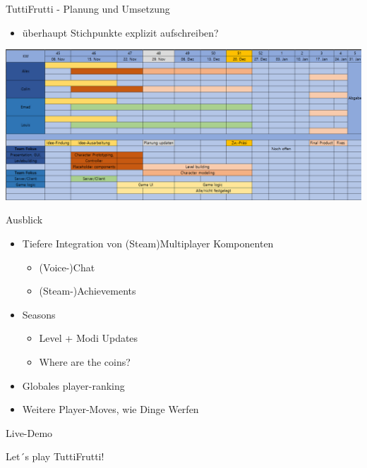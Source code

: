 \documentclass[xcolor=dvipsnames]{beamer}
\begin{document}
\begin{frame}{TuttiFrutti - Planung und Umsetzung}
\begin{itemize}
		\item überhaupt Stichpunkte explizit aufschreiben?
\end{itemize}
\begin{center}
		\includegraphics[width=1\textwidth]{ProjektPlanung_6times90.png}
\end{center}

\end{frame}

\begin{frame}{Ausblick}
\begin{itemize}
 		\item Tiefere Integration von (Steam)Multiplayer Komponenten
 			\begin{itemize}
 				\item (Voice-)Chat
 				\item (Steam-)Achievements
 			\end{itemize}
 		\item Seasons
 			\begin{itemize}
	 			\item Level + Modi Updates
	 			\item Where are the coins?
 			\end{itemize}
 		\item Globales player-ranking
 		\item Weitere Player-Moves, wie Dinge Werfen
\end{itemize}

\end{frame}

\begin{frame}{Live-Demo}

\begin{center}
	\Huge{\textcolor{OliveGreen}{Let´s play TuttiFrutti!}}
\end{center}

\end{frame}
\end{document}
